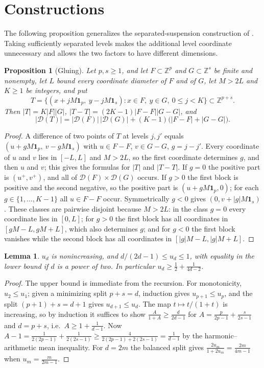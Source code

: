 \documentclass[11pt]{amsart}
\newtheorem{lemma}[theorem]{Lemma}
\newtheorem{proposition}[theorem]{Proposition}
\theoremstyle{definition}
\theoremstyle{remark}
\newcommand{\Z}{\mathbb{Z}}
\newcommand{\Dp}{\mathcal{D}}
\begin{document}
\section{Constructions}\label{sec:constructions}

The following proposition generalizes the separated-suspension construction of \cite[Lemma A.6]{PC26}. Taking sufficiently separated levels makes the additional level coordinate unnecessary and allows the two factors to have different dimensions.

\begin{proposition}[Gluing]\label{prop:glue}
Let $p,s\ge1$, and let $F\subset\Z^p$ and $G\subset\Z^s$ be finite and nonempty, let $L$ bound every coordinate diameter of $F$ and of $G$, let $M>2L$ and $K\ge1$ be integers, and put
\[
T=\big\{(x+jM\mathbf 1_p,\ y-jM\mathbf 1_s):x\in F,\ y\in G,\ 0\le j<K\big\}\subset\Z^{p+s}.
\]
Then $|T|=K|F||G|$, $|T-T|=(2K-1)|F-F||G-G|$, and
\[
|\Dp(T)|=|\Dp(F)|\,|\Dp(G)|+(K-1)\big(|F-F|+|G-G|\big).
\]
\end{proposition}

\begin{proof}
A difference of two points of $T$ at levels $j,j'$ equals $(u+gM\mathbf 1_p,\ v-gM\mathbf1_s)$ with $u\in F-F$, $v\in G-G$, $g=j-j'$. Every coordinate of $u$ and $v$ lies in $[-L,L]$ and $M>2L$, so the first coordinate determines $g$, and then $u$ and $v$; this gives the formulas for $|T|$ and $|T-T|$. If $g=0$ the positive part is $(u^+,v^+)$, and all of $\Dp(F)\times\Dp(G)$ occurs. If $g>0$ the first block is positive and the second negative, so the positive part is $(u+gM\mathbf 1_p,0)$; for each $g\in\{1,\dots,K-1\}$ all $u\in F-F$ occur. Symmetrically $g<0$ gives $(0,v+|g|M\mathbf 1_s)$. These classes are pairwise disjoint because $M>2L$: in the class $g=0$ every coordinate lies in $[0,L]$; for $g>0$ the first block has all coordinates in $[gM-L,gM+L]$, which also determines $g$; and for $g<0$ the first block vanishes while the second block has all coordinates in $[|g|M-L,|g|M+L]$.
\end{proof}

\begin{lemma}\label{lem:ud}
$u_d$ is nonincreasing, and $d/(2d-1)\le u_d\le1$, with equality in the lower bound if $d$ is a power of two. In particular $u_d\ge \tfrac12+\tfrac1{4d-2}$.
\end{lemma}

\begin{proof}
The upper bound is immediate from the recursion. For monotonicity, $u_2\le u_1$; given a minimizing split $p+s=d$, induction gives $u_{p+1}\le u_p$, and the split $(p+1)+s=d+1$ gives $u_{d+1}\le u_d$. The map $t\mapsto t/(1+t)$ is increasing, so by induction it suffices to show $\frac{A}{1+A}\ge\frac{d}{2d-1}$ for $A=\frac{p}{2p-1}+\frac{s}{2s-1}$ and $d=p+s$, i.e.\ $A\ge 1+\frac1{d-1}$. Now $A-1=\frac1{2(2p-1)}+\frac1{2(2s-1)}\ge\frac{4}{2(2p-1)+2(2s-1)}=\frac1{d-1}$ by the harmonic--arithmetic mean inequality. For $d=2m$ the balanced split gives $\frac{2u_m}{1+2u_m}=\frac{2m}{4m-1}$ when $u_m=\frac{m}{2m-1}$.
\end{proof}
\end{document}
